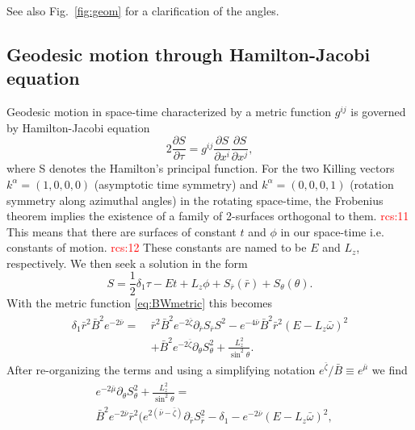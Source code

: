 \documentclass[iop, usenatbib]{emulateapj}
\newcommand{\be}{\begin{equation}}
\newcommand{\ee}{\end{equation}}
\newcommand{\red}[1]{\textcolor{red}{#1}}
\newcommand{\pd}{\ensuremath{\partial}} %
\newcommand{\rb}{\ensuremath{\bar{r}}}
\newcommand{\wb}{\ensuremath{\bar{\omega}}}
\newcommand{\nub}{\ensuremath{\bar{\nu}}}
\newcommand{\zetab}{\ensuremath{\bar{\zeta}}}
\newcommand{\Bb}{\ensuremath{\bar{B}}}
\newcommand{\mub}{\ensuremath{\bar{\mu}}}
\begin{document}
See also Fig.~\ref{fig:geom} for a clarification of the angles.

\subsection{Geodesic motion through Hamilton-Jacobi equation}
Geodesic motion in space-time characterized by a metric function $g^{ij}$ is governed by Hamilton-Jacobi equation
\be
2\frac{\pd S}{\pd \tau} = g^{ij} \frac{\pd S}{\pd x^i}\frac{\pd S}{\pd x^j},
\ee
where S denotes the Hamilton's principal function.
For the two Killing vectors $k^{\alpha} = (1,0,0,0)$ (asymptotic time symmetry) and $k^{\alpha} = (0,0,0,1)$ (rotation symmetry along azimuthal angles) in the rotating space-time, the Frobenius theorem implies the existence of a family of 2-surfaces orthogonal to them. \red{rcs:11}
This means that there are surfaces of constant $t$ and $\phi$ in our space-time i.e. constants of motion. \red{rcs:12}
These constants are named to be $E$ and $L_z$, respectively.
We then seek a solution in the form
\be
S = \frac{1}{2}\delta_1 \tau - Et + L_z\phi + S_{\rb}(\rb) + S_{\theta}(\theta).
\ee
With the metric function \eqref{eq:BWmetric} this becomes
\begin{align}\begin{split} 
    \delta_1 \rb^2 \Bb^2 e^{-2\nub} =~& \rb^2 \Bb^2 e^{-2\zetab} \pd_{\rb}S_{\rb}S^2 - e^{-4\nub} \Bb^2 \rb^2 (E - L_z \wb)^2 \\
                                & + \Bb^2 e^{-2\zetab} \pd_{\theta}S_{\theta}^2 + \frac{L_z^2}{\sin^2\theta}.
\end{split}\end{align}
After re-organizing the terms and using a simplifying notation $e^{\zetab}/\Bb \equiv e^{\mub}$ we find
\begin{align}\begin{split}\label{eq:S}
& e^{-2\mub}\pd_{\theta}S_{\theta}^2 + \frac{L_z^2}{\sin^2\theta} = \\ 
& \Bb^2 e^{-2\nub}\rb^2 ( e^{2(\nub-\zetab)} \pd_{\rb}S_{\rb}^2 -\delta_{1} - e^{-2\nub}(E - L_z \wb)^2,
\end{split}\end{align}
\end{document}
